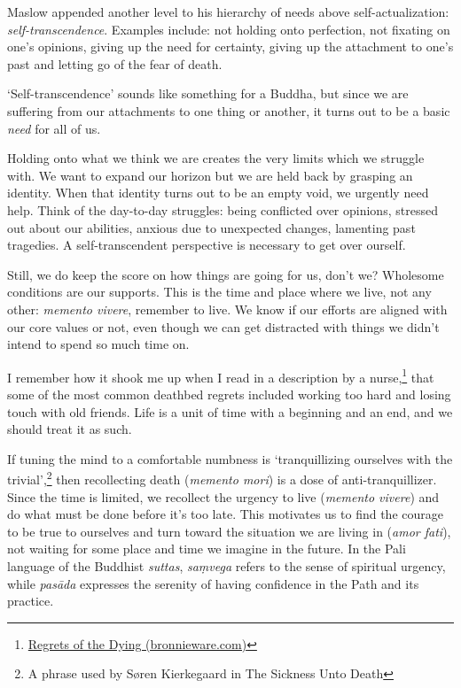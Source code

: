 \clearpage
\normalpagelayout

Maslow appended another level to his hierarchy of needs above
self-actualization: \emph{self-transcendence}. Examples include: not
holding onto perfection, not fixating on one's opinions, giving up the
need for certainty, giving up the attachment to one's past and letting
go of the fear of death.

`Self-transcendence' sounds like something for a Buddha, but since we
are suffering from our attachments to one thing or another, it turns out
to be a basic \emph{need} for all of us.

Holding onto what we think we are creates the very limits which we
struggle with. We want to expand our horizon but we are held back by
grasping an identity. When that identity turns out to be an empty void,
we urgently need help. Think of the day-to-day struggles: being
conflicted over opinions, stressed out about our abilities, anxious due
to unexpected changes, lamenting past tragedies. A self-transcendent
perspective is necessary to get over ourself.

\enlargethispage*{3\baselineskip}

Still, we do keep the score on how things are going for us, don't we?
Wholesome conditions are our supports. This is the time and place where
we live, not any other: \emph{memento vivere}, remember to live. We know
if our efforts are aligned with our core values or not, even though we
can get distracted with things we didn't intend to spend so much time
on.

I remember how it shook me up when I read in a description by a
nurse,\footnote{\href{https://bronnieware.com/blog/regrets-of-the-dying/}{Regrets
  of the Dying (bronnieware.com)}} that some of the most common deathbed
regrets included working too hard and losing touch with old friends.
Life is a unit of time with a beginning and an end, and we should treat
it as such.

\clearpage


If tuning the mind to a comfortable numbness is `tranquillizing
ourselves with the trivial',\footnote{A phrase used by Søren Kierkegaard
  in The Sickness Unto Death} then recollecting death (\emph{memento
mori}) is a dose of anti-tranquillizer. Since the time is limited, we
recollect the urgency to live (\emph{memento vivere}) and do what must
be done before it's too late. This motivates us to find the courage to
be true to ourselves and turn toward the situation we are living in
(\emph{amor fati}), not waiting for some place and time we imagine in
the future. In the Pali language of the Buddhist \emph{suttas},
\emph{saṃvega} refers to the sense of spiritual urgency, while
\emph{pasāda} expresses the serenity of having confidence in the Path
and its practice.

